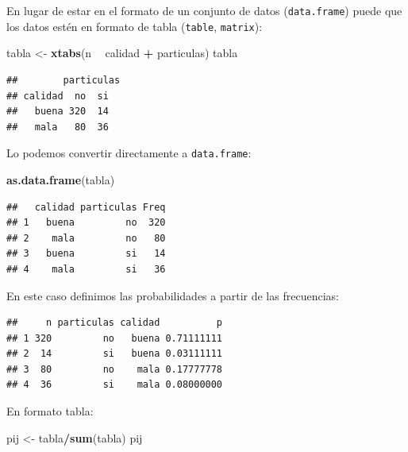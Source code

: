 \documentclass[]{book}
\newenvironment{Shaded}{\begin{snugshade}}{\end{snugshade}}
\newcommand{\KeywordTok}[1]{\textcolor[rgb]{0.13,0.29,0.53}{\textbf{#1}}}
\newcommand{\StringTok}[1]{\textcolor[rgb]{0.31,0.60,0.02}{#1}}
\newcommand{\OperatorTok}[1]{\textcolor[rgb]{0.81,0.36,0.00}{\textbf{#1}}}
\newcommand{\NormalTok}[1]{#1}
\theoremstyle{definition}
\theoremstyle{definition}
\theoremstyle{definition}
\theoremstyle{remark}
\begin{document}
En lugar de estar en el formato de un conjunto de datos
(\texttt{data.frame}) puede que los datos estén en formato de tabla
(\texttt{table}, \texttt{matrix}):

\begin{Shaded}
\begin{Highlighting}[]
\NormalTok{tabla <-}\StringTok{ }\KeywordTok{xtabs}\NormalTok{(n }\OperatorTok{~}\StringTok{ }\NormalTok{calidad }\OperatorTok{+}\StringTok{ }\NormalTok{particulas)}
\NormalTok{tabla}
\end{Highlighting}
\end{Shaded}

\begin{verbatim}
##        particulas
## calidad  no  si
##   buena 320  14
##   mala   80  36
\end{verbatim}

Lo podemos convertir directamente a \texttt{data.frame}:

\begin{Shaded}
\begin{Highlighting}[]
\KeywordTok{as.data.frame}\NormalTok{(tabla)}
\end{Highlighting}
\end{Shaded}

\begin{verbatim}
##   calidad particulas Freq
## 1   buena         no  320
## 2    mala         no   80
## 3   buena         si   14
## 4    mala         si   36
\end{verbatim}

En este caso definimos las probabilidades a partir de las frecuencias:

\begin{Shaded}
\end{Shaded}

\begin{verbatim}
##     n particulas calidad          p
## 1 320         no   buena 0.71111111
## 2  14         si   buena 0.03111111
## 3  80         no    mala 0.17777778
## 4  36         si    mala 0.08000000
\end{verbatim}

En formato tabla:

\begin{Shaded}
\begin{Highlighting}[]
\NormalTok{pij <-}\StringTok{ }\NormalTok{tabla}\OperatorTok{/}\KeywordTok{sum}\NormalTok{(tabla)}
\NormalTok{pij}
\end{Highlighting}
\end{Shaded}
\end{document}
